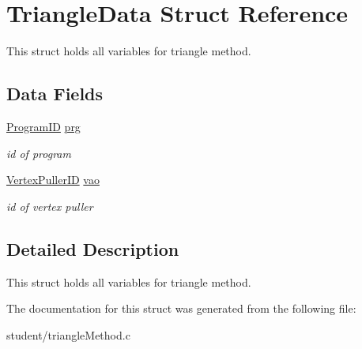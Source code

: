 \hypertarget{structTriangleData}{}\section{Triangle\+Data Struct Reference}
\label{structTriangleData}


This struct holds all variables for triangle method.  


\subsection*{Data Fields}
\begin{DoxyCompactItemize}
\item 
\mbox{\label{structTriangleData_a9bdda6d3ffdde266d800f8b8461e5c36}} 
\hyperlink{student_2fwd_8h_a15e62786033208aec9487a51e808f81d}{Program\+ID} \hyperlink{structTriangleData_a9bdda6d3ffdde266d800f8b8461e5c36}{prg}
\begin{DoxyCompactList}\small\item\em id of program \end{DoxyCompactList}\item 
\mbox{\label{structTriangleData_ac92ea521b3747c90aeb6725378fc4a03}} 
\hyperlink{student_2fwd_8h_a23828e2281a794e193ebaf0df3e1f17c}{Vertex\+Puller\+ID} \hyperlink{structTriangleData_ac92ea521b3747c90aeb6725378fc4a03}{vao}
\begin{DoxyCompactList}\small\item\em id of vertex puller \end{DoxyCompactList}\end{DoxyCompactItemize}


\subsection{Detailed Description}
This struct holds all variables for triangle method. 

The documentation for this struct was generated from the following file\+:\begin{DoxyCompactItemize}
\item 
student/triangle\+Method.\+c\end{DoxyCompactItemize}
